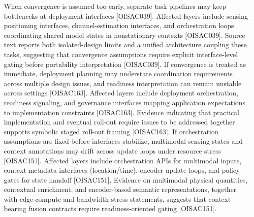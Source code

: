{}
\markdownRendererSectionEnd \markdownRendererSectionBegin
{}\markdownRendererInterblockSeparator
{}When convergence is assumed too early, separate task pipelines may keep bottlenecks at deployment interfaces [O\markdownRendererUnderscore{}ISAC\markdownRendererUnderscore{}039]. Affected layers include sensing-positioning interfaces, channel-estimation interfaces, and orchestration loops coordinating shared model states in nonstationary contexts [O\markdownRendererUnderscore{}ISAC\markdownRendererUnderscore{}039]. Source text reports both isolated-design limits and a unified architecture coupling these tasks, suggesting that convergence assumptions require explicit interface-level gating before portability interpretation [O\markdownRendererUnderscore{}ISAC\markdownRendererUnderscore{}039].\markdownRendererInterblockSeparator
{}
\markdownRendererSectionEnd \markdownRendererSectionBegin
{}\markdownRendererInterblockSeparator
{}If convergence is treated as immediate, deployment planning may understate coordination requirements across multiple design issues, and readiness interpretation can remain unstable across settings [O\markdownRendererUnderscore{}ISAC\markdownRendererUnderscore{}163]. Affected layers include deployment orchestration, readiness signaling, and governance interfaces mapping application expectations to implementation constraints [O\markdownRendererUnderscore{}ISAC\markdownRendererUnderscore{}163]. Evidence indicating that practical implementation and eventual roll-out require issues to be addressed together supports symbolic staged roll-out framing [O\markdownRendererUnderscore{}ISAC\markdownRendererUnderscore{}163].\markdownRendererInterblockSeparator
{}
\markdownRendererSectionEnd \markdownRendererSectionBegin
{}\markdownRendererInterblockSeparator
{}If orchestration assumptions are fixed before interfaces stabilize, multimodal sensing states and context annotations may drift across update loops under resource stress [O\markdownRendererUnderscore{}ISAC\markdownRendererUnderscore{}151]. Affected layers include orchestration APIs for multimodal inputs, context metadata interfaces (location/time), encoder update loops, and policy gates for state handoff [O\markdownRendererUnderscore{}ISAC\markdownRendererUnderscore{}151]. Evidence on multimodal physical quantities, contextual enrichment, and encoder-based semantic representations, together with edge-compute and bandwidth stress statements, suggests that context-bearing fusion contracts require readiness-oriented gating [O\markdownRendererUnderscore{}ISAC\markdownRendererUnderscore{}151].\markdownRendererInterblockSeparator
